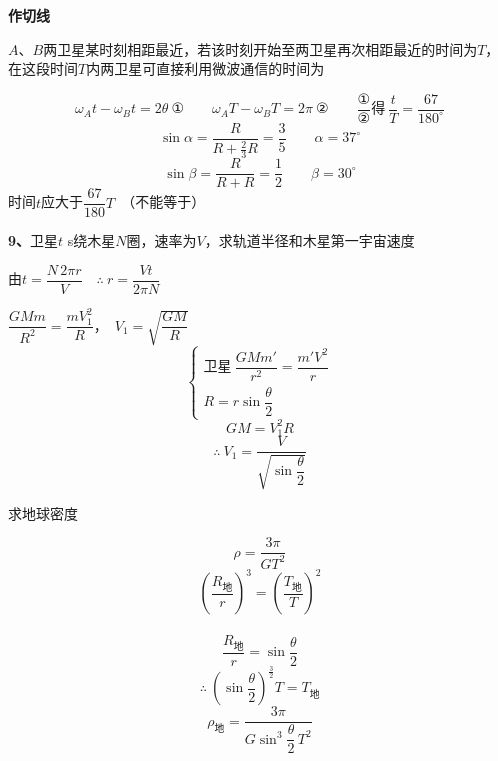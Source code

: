 \textbf{作切线}

\begin{problem}
$A$、$B$两卫星某时刻相距最近，若该时刻开始至两卫星再次相距最近的时间为$T$，在这段时间$T$内两卫星可直接利用微波通信的时间为%
\begin{solution}
\[ \omega_A t-\omega_B t=2\theta\ \text{①}\qquad \omega_A T-\omega_B T=2\pi\ \text{②}\qquad \dfrac{\text{①}}{\text{②}}\text{得}\ \dfrac{t}{T}=\dfrac{67}{180^\circ} \]
\[ \sin\alpha=\dfrac{R}{R+\frac{2}{3}R}=\dfrac{3}{5}\qquad \alpha=37^\circ \]
\[ \sin\beta=\dfrac{R}{R+R}=\dfrac{1}{2}\qquad \beta=30^\circ \]
时间$t$应大于$\dfrac{67}{180}T$　（不能等于）
\end{solution}
\end{problem}
\begin{problem}[9]
\textbf{9、}卫星$t$ s绕木星$N$圈，速率为$V$，求轨道半径和木星第一宇宙速度
\begin{solution}
由$t=\dfrac{N\,2\pi r}{V}$　$\therefore\ r=\dfrac{Vt}{2\pi N}$

$\dfrac{GMm}{R^2}=\dfrac{mV_1^2}{R}$，　$V_1=\sqrt{\dfrac{GM}{R}}$
\[ \begin{cases}
\text{卫星}\ \dfrac{GMm'}{r^2}=\dfrac{m'V^2}{r}\\[4pt]
R=r\sin\dfrac{\theta}{2}
\end{cases} \]
\[ GM=V_1^2R \]
\[ \therefore\ V_1=\dfrac{V}{\sqrt{\sin\dfrac{\theta}{2}}} \]
\end{solution}
\end{problem}
\begin{problem}
求地球密度
\begin{solution}
\[ \rho=\dfrac{3\pi}{GT^2} \]
\[ \left(\dfrac{R_{\text{地}}}{r}\right)^3=\left(\dfrac{T_{\text{地}}}{T}\right)^2 \]
　
\[ \dfrac{R_{\text{地}}}{r}=\sin\dfrac{\theta}{2} \]
\[ \therefore\ \left(\sin\dfrac{\theta}{2}\right)^{\frac{3}{2}}T=T_{\text{地}} \] %
\[ \rho_{\text{地}}=\dfrac{3\pi}{G\sin^{3}\dfrac{\theta}{2}\,T^2} \]
\end{solution}
\end{problem}
